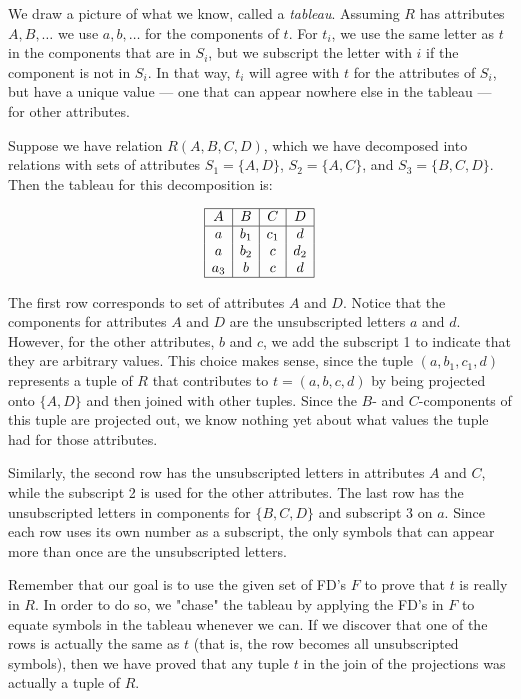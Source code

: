 \documentclass{article}
\begin{document}
    We draw a picture of what we know, called a \emph{tableau}. Assuming $R$ has attributes $A,B,\ldots$ we use $a,b,\ldots$ for the components of $t$. For $t_i$, we use the same letter as $t$ in the components that are in $S_i$, but we subscript the letter with $i$ if the component is not in $S_i$. In that way, $t_i$ will agree with $t$ for the attributes of $S_i$, but have a unique value — one that can appear nowhere else in the tableau — for other attributes.

    \begin{example}
      Suppose we have relation $R(A,B,C,D)$, which we have decomposed into relations with sets of attributes $S_1 = \{A,D\}$, $S_2 = \{A,C\}$, and $S_3 = \{B,C,D\}$. Then the tableau for this decomposition is:

      \[
      \begin{array}{|c|c|c|c|}
      \hline
      A & B & C & D \\
      \hline
      a & b_1 & c_1 & d \\
      a & b_2 & c & d_2 \\
      a_3 & b & c & d \\
      \hline
      \end{array}
      \]

      The first row corresponds to set of attributes $A$ and $D$. Notice that the components for attributes $A$ and $D$ are the unsubscripted letters $a$ and $d$. However, for the other attributes, $b$ and $c$, we add the subscript 1 to indicate that they are arbitrary values. This choice makes sense, since the tuple $(a,b_1,c_1,d)$ represents a tuple of $R$ that contributes to $t = (a,b,c,d)$ by being projected onto $\{A,D\}$ and then joined with other tuples. Since the $B$- and $C$-components of this tuple are projected out, we know nothing yet about what values the tuple had for those attributes.

      Similarly, the second row has the unsubscripted letters in attributes $A$ and $C$, while the subscript 2 is used for the other attributes. The last row has the unsubscripted letters in components for $\{B,C,D\}$ and subscript 3 on $a$. Since each row uses its own number as a subscript, the only symbols that can appear more than once are the unsubscripted letters.
    \end{example}

    Remember that our goal is to use the given set of FD's $F$ to prove that $t$ is really in $R$. In order to do so, we "chase" the tableau by applying the FD's in $F$ to equate symbols in the tableau whenever we can. If we discover that one of the rows is actually the same as $t$ (that is, the row becomes all unsubscripted symbols), then we have proved that any tuple $t$ in the join of the projections was actually a tuple of $R$.
\end{document}
